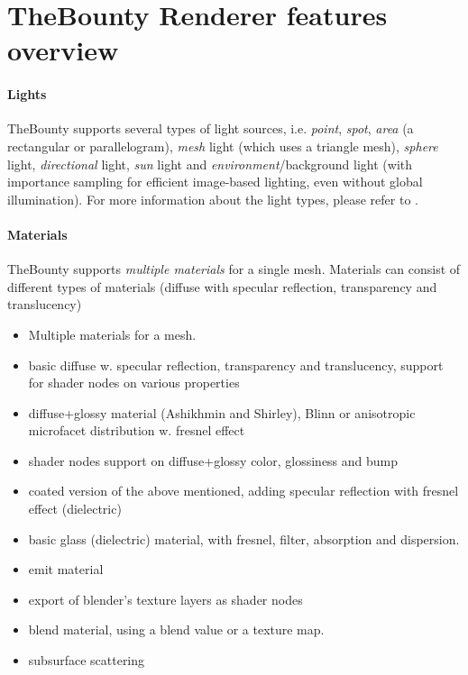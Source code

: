 \section*{TheBounty Renderer features overview}

\paragraph{Lights}
TheBounty supports several types of light sources, i.e. \textit{point}, \textit{spot}, \textit{area} (a rectangular or parallelogram), \textit{mesh} light (which uses a triangle mesh), \textit{sphere} light, \textit{directional} light, \textit{sun} light and \textit{environment}/background light (with importance sampling for efficient image-based lighting, even without global illumination). For more information about the light types, please refer to .

\paragraph{Materials} TheBounty supports \textit{multiple materials} for a single mesh. Materials can consist of different types of materials (diffuse with specular reflection, transparency and translucency)



\begin{itemize}
\item Multiple materials for a mesh.
\item basic diffuse w. specular reflection, transparency and translucency, support for shader nodes on various properties
\item diffuse+glossy material (Ashikhmin and Shirley), Blinn or anisotropic microfacet distribution w. fresnel effect
\item shader nodes support on diffuse+glossy color, glossiness and bump
\item coated version of the above mentioned, adding specular reflection with fresnel effect (dielectric)
\item basic glass (dielectric) material, with fresnel, filter, absorption and dispersion.
\item emit material
\item export of blender's texture layers as shader nodes
\item blend material, using a blend value or a texture map.
\item subsurface scattering
\end{itemize}

